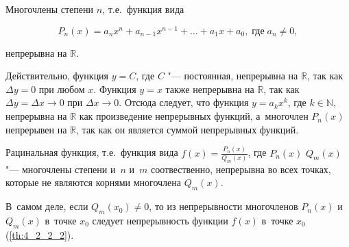 
Многочлены степени $n$, т.е.\ функция вида

\begin{equation*}
P_{n}(x) = a_{n}x^{n} + a_{n-1}x^{n-1} + \dots + a_{1}x + a_{0}, \;
\text{где} \; a_{n} \ne 0,
\end{equation*}

\noindent
непрерывна на $\mathbb{R}$.

Действительно, функция $y = C$, где $C$ "--- постоянная, непрерывна на $\mathbb{R}$, 
так как $\Delta y = 0$ при любом $x$.
Функция $y = x$ также непрерывна на $\mathbb{R}$, так как $\Delta y = \Delta x \to 0$
при $\Delta x \to 0$. Отсюда следует, что функция $y = a_{k}x^{k}$, где $k \in \mathbb{N}$,
непрерывна на $\mathbb{R}$ как произведение непрерывных функций, а~многочлен $P_{n}(x)$
непрерывен на $\mathbb{R}$, так как он является суммой непрерывных функций.

Рацинальная функция, т.е.\ функция вида
$\displaystyle f(x) = \frac{P_{n}(x)}{Q_{m}(x)}$,
где $P_{n}(x)$ $Q_{m}(x)$ "--- многочлены степени и~$n$ и~$m$ соотвественно,
непрерывна во всех точках, которые не являются корнями многочлена $Q_{m}(x)$.

В~самом деле, если $Q_{m}(x_{0}) \ne 0$, то из непрерывности многочленов
$P_{n}(x)$ и~$Q_{m}(x)$ в~точке $x_{0}$ следует непрерывность функции $f(x)$
в~точке $x_{0}$ (\ref{th:4_2_2_2}).
